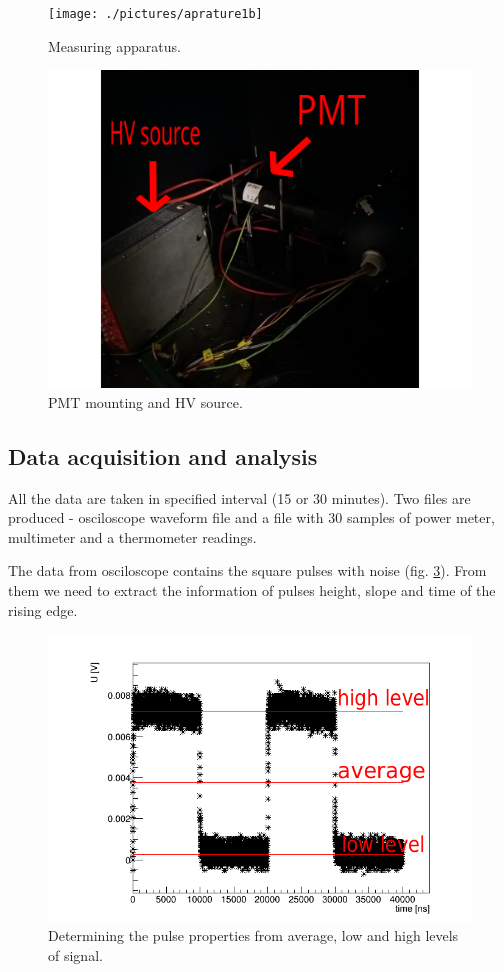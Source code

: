 \begin{figure}[H]
 \centering
 \texttt{[image: ./pictures/aprature1b]}
 \caption{Measuring apparatus.}
 \label{aparature1}
\end{figure}

\begin{figure}[H]
 \centering
 \includegraphics[scale = 0.09]{./pictures/aparature2b}
 \caption{PMT mounting and HV source.}
 \label{aparature2}
\end{figure}


\subsection{Data acquisition and analysis}
All the data are taken in specified interval (15 or 30 minutes). Two files are produced - osciloscope waveform file and a file with 30 samples of power meter, multimeter and a thermometer readings.
\par
The data from osciloscope contains the square pulses with noise (fig. \ref{pulse}). From them we need to extract the information of pulses height, slope and time of the rising edge.

 \begin{figure}[H]
 \centering
 \includegraphics[scale=0.65]{./pictures/PMTPulse}
 \caption{Determining the pulse properties from average, low and high levels of signal.}
 \label{pulse}
\end{figure}



